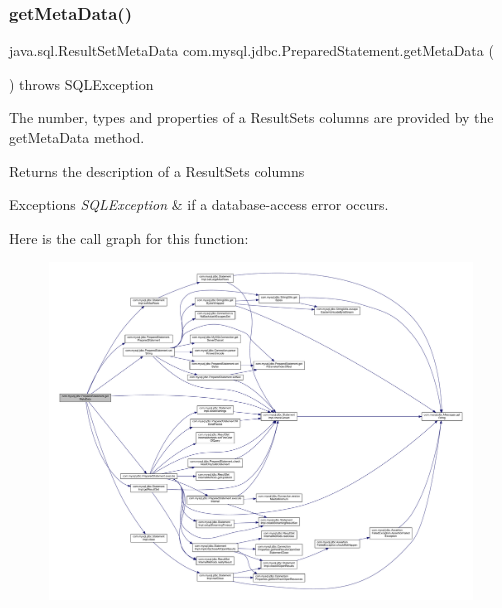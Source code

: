 \subsubsection{\texorpdfstring{get\+Meta\+Data()}{getMetaData()}}
{\footnotesize\ttfamily java.\+sql.\+Result\+Set\+Meta\+Data com.\+mysql.\+jdbc.\+Prepared\+Statement.\+get\+Meta\+Data (\begin{DoxyParamCaption}{ }\end{DoxyParamCaption}) throws S\+Q\+L\+Exception}

The number, types and properties of a Result\+Set\textquotesingle{}s columns are provided by the get\+Meta\+Data method.

\begin{DoxyReturn}{Returns}
the description of a Result\+Set\textquotesingle{}s columns
\end{DoxyReturn}

\begin{DoxyExceptions}{Exceptions}
{\em S\+Q\+L\+Exception} & if a database-\/access error occurs. \\
\hline
\end{DoxyExceptions}
Here is the call graph for this function\+:
\nopagebreak
\begin{figure}[H]
\begin{center}
\leavevmode
\includegraphics[width=350pt]{classcom_1_1mysql_1_1jdbc_1_1_prepared_statement_a260be2cc343e066802a49720c672da77_cgraph}
\end{center}
\end{figure}
\mbox{\label{classcom_1_1mysql_1_1jdbc_1_1_prepared_statement_a80a81c39177a5e46c653efb1acd9e797}} 

